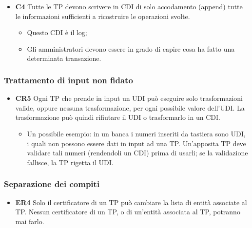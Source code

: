 \begin{itemize}
      \item \textbf{C4} Tutte le TP devono scrivere in CDI di solo accodamento
            (append) tutte le informazioni
            sufficienti a ricostruire le operazioni svolte.
            \begin{itemize}
                  \item Questo CDI è il log;
                  \item Gli amministratori devono essere in grado di capire
                        cosa ha fatto una determinata
                        transazione.
            \end{itemize}
\end{itemize}

\subsubsection{Trattamento di input non fidato}

\begin{itemize}
      \item \textbf{CR5} Ogni TP che prende in input un UDI può eseguire solo
            trasformazioni valide, oppure
            nessuna trasformazione, per ogni possibile valore dell’UDI. 
            La trasformazione può quindi rifiutare il
            UDI o trasformarlo in un CDI.
            \begin{itemize}
                  \item Un possibile esempio: in un banca i numeri inseriti
                        da tastiera sono UDI, i quali non possono essere dati in input
                        ad una TP. Un’apposita TP deve validare tali numeri 
                        (rendendoli un CDI) prima di usarli; se
                        la validazione fallisce, la TP rigetta il UDI.
            \end{itemize}
\end{itemize}

\subsubsection{Separazione dei compiti}

\begin{itemize}
      \item \textbf{ER4} Solo il certificatore di un TP può cambiare la lista di
            entità associate al TP. Nessun
            certificatore di un TP, o di un’entità associata al TP, potranno mai 
            farlo.
\end{itemize}

